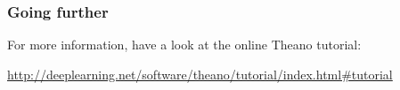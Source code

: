 \documentclass[mathserif, xcolor=dvipsnames]{beamer}
\begin{document}
\begin{frame}
    \frametitle{Going further}
    For more information, have a look at the online Theano tutorial:
    \begin{center}
        \url{http://deeplearning.net/software/theano/tutorial/index.html\#tutorial}
    \end{center}
\end{frame}
\end{document}
